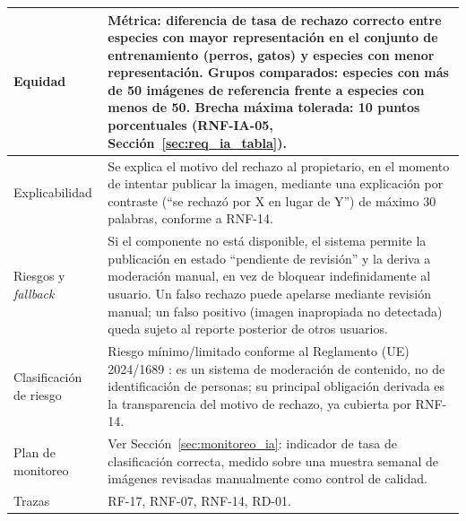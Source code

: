 \documentclass[journal,onecolumn]{IEEEtran}
\begin{document}
\begin{table}[H]
\begin{tabularx}{\textwidth}{|L{4.2cm}|X|}
		\hline
		Equidad & Métrica: diferencia de tasa de rechazo correcto entre especies con mayor representación en el conjunto de entrenamiento (perros, gatos) y especies con menor representación. Grupos comparados: especies con más de 50 imágenes de referencia frente a especies con menos de 50. Brecha máxima tolerada: 10 puntos porcentuales (RNF-IA-05, Sección~\ref{sec:req_ia_tabla}). \\
		\hline
		Explicabilidad & Se explica el motivo del rechazo al propietario, en el momento de intentar publicar la imagen, mediante una explicación por contraste (``se rechazó por X en lugar de Y'') de máximo 30 palabras, conforme a RNF-14. \\
		\hline
		Riesgos y \textit{fallback} & Si el componente no está disponible, el sistema permite la publicación en estado ``pendiente de revisión'' y la deriva a moderación manual, en vez de bloquear indefinidamente al usuario. Un falso rechazo puede apelarse mediante revisión manual; un falso positivo (imagen inapropiada no detectada) queda sujeto al reporte posterior de otros usuarios. \\
		\hline
		Clasificación de riesgo & Riesgo mínimo/limitado conforme al Reglamento (UE) 2024/1689 \cite{euaiact2024}: es un sistema de moderación de contenido, no de identificación de personas; su principal obligación derivada es la transparencia del motivo de rechazo, ya cubierta por RNF-14. \\
		\hline
		Plan de monitoreo & Ver Sección~\ref{sec:monitoreo_ia}: indicador de tasa de clasificación correcta, medido sobre una muestra semanal de imágenes revisadas manualmente como control de calidad. \\
		\hline
		Trazas & RF-17, RNF-07, RNF-14, RD-01. \\
		\hline
	\end{tabularx}
\end{table}
\end{document}
